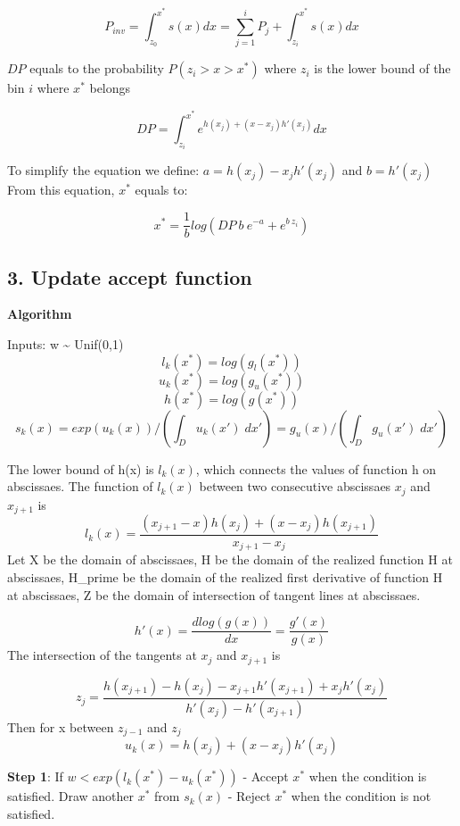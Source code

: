 \documentclass[]{article}
\begin{document}
\[
P_{inv} = \int^{x^*}_{z_0} s(x) dx = \sum^i_{j=1}P_j + \int^{x^*}_{z_i} s(x) dx
\]

\(DP\) equals to the probability \(P(z_i > x > x^*)\) where \(z_i\) is
the lower bound of the bin \(i\) where \(x^*\) belongs

\[
DP = \int^{x^*}_{z_i} e^{h(x_j) + (x-x_j) h'(x_j)} dx 
\]

To simplify the equation we define: \(a = h(x_j)-x_j h'(x_j)\) and
\(b = h'(x_j)\) From this equation, \(x^*\) equals to:

\[
x^* = \frac{1}{b} log(DP~b~e^{-a} +  e^{b~z_i})
\]

\subsection{3. Update accept function}\label{update-accept-function}

\textbf{Algorithm}

Inputs: w \textasciitilde{} Unif(0,1) \newline
\[l_{k}(x^{*}) = log(g_{l}(x^{*}))\]
\[u_{k}(x^{*}) = log(g_{u}(x^{*}))\] \[h(x^{*}) = log(g(x^{*}))\]
\[s_{k}(x) = exp(u_{k}(x))/\left(\int_{D} u_{k}(x') \; dx'\right) = g_{u}(x)/\left(\int_{D} g_{u}(x') \; dx'\right)\]

The lower bound of h(x) is \(l_{k}(x)\), which connects the values of
function h on abscissaes. The function of \(l_{k}(x)\) between two
consecutive abscissaes \(x_{j}\) and \(x_{j+1}\) is
\[l_{k}(x) = \frac{(x_{j+1} - x)h(x_{j}) + (x - x_{j})h(x_{j+1})}{x_{j+1} - x_{j}}\]
Let X be the domain of abscissaes, H be the domain of the realized
function H at abscissaes, H\_prime be the domain of the realized first
derivative of function H at abscissaes, Z be the domain of intersection
of tangent lines at abscissaes.

\[h'(x) = \frac{dlog(g(x))}{dx} = \frac{g'(x)}{g(x)}\] The intersection
of the tangents at \(x_{j}\) and \(x_{j+1}\) is

\[z_j = \frac{h(x_{j+1})-h(x_{j}) - x_{j+1}h'(x_{j+1})+x_{j}h'(x_{j})}{h'(x_{j})-h'(x_{j+1})}\]
Then for x between \(z_{j-1}\) and \(z_{j}\)
\[u_{k}(x) = h(x_{j}) + (x-x_{j})h'(x_{j})\]

\textbf{Step 1}: If \(w < exp(l_{k}(x^{*}) - u_{k}(x^{*}))\) \newline
- Accept \(x^{*}\) when the condition is satisfied. Draw another
\(x^{*}\) from \(s_{k}(x)\) \newline
- Reject \(x^{*}\) when the condition is not satisfied.
\end{document}
